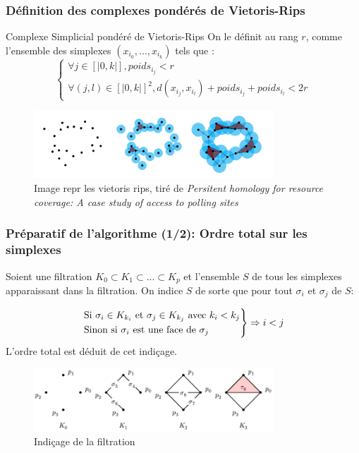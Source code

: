 \documentclass{beamer}
\begin{document}
\begin{frame}
    \frametitle{Définition des complexes pondérés de Vietoris-Rips}
    \begin{block}{Complexe Simplicial pondéré de Vietoris-Rips}
        On le définit au rang $r$, comme l'ensemble des simplexes $(x_{i_0}, ..., x_{i_k})$ tels que : 
        $$
            \begin{cases}
                \forall j \in [|0, k|], poids_{i_j} < r\\
                \forall (j,l) \in [|0, k|]^2, d(x_{i_j}, x_{i_l}) + poids_{i_j} + poids_{i_l} < 2r
            \end{cases}
        $$
    \end{block}

    \begin{figure}
        \centering
        \includegraphics[width=0.8\textwidth]{../images/cech.png}
        \caption{Image repr les vietoris rips, tiré de \textit{Persitent homology for resource coverage: A case study of access to polling sites}}
    \end{figure}
    
\end{frame}

\begin{frame}
    \frametitle{Préparatif de l'algorithme (1/2): Ordre total sur les simplexes}
    Soient une filtration $K_0 \subset K_1 \subset ... \subset K_p$ et l'ensemble $S$ de tous les simplexes apparaissant dans la filtration. On indice $S$ de sorte que pour tout $\sigma_i$ et $\sigma_j$ de $S$: 

    $$ 
    \begin{rcases}
        \text{Si } \sigma_i \in K_{k_i} \text{ et } \sigma_j \in K_{k_j} \text{ avec } k_i < k_j\\
        \text{Sinon si } \sigma_i \text{ est une face de } \sigma_j
    \end{rcases}\Rightarrow i < j 
    $$
    L'ordre total est déduit de cet indiçage.
    \begin{figure}
        \centering
        \includegraphics[width=0.8\textwidth]{../images/filtration_horizontal.png}
        \caption{Indiçage de la filtration}
    \end{figure}
\end{frame}
\end{document}
